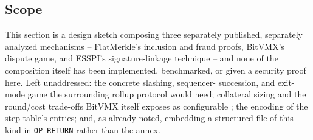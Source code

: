 \subsection{Scope}
\label{sec:rollup-scope}

This section is a design sketch composing three separately published,
separately analyzed mechanisms -- FlatMerkle's inclusion and fraud proofs,
BitVMX's dispute game, and ESSPI's signature-linkage technique -- and none
of the composition itself has been implemented, benchmarked, or given a
security proof here. Left unaddressed: the concrete slashing, sequencer-
succession, and exit-mode game the surrounding rollup protocol would need;
collateral sizing and the round/cost trade-offs BitVMX itself exposes as
configurable \citep{lerner2024bitvmx}; the encoding of the step table's
entries; and, as already noted, embedding a structured file of this kind in
\texttt{OP\_RETURN} rather than the annex.
